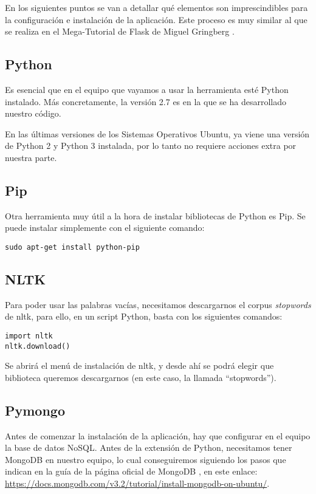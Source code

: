 En los siguientes puntos se van a detallar qué elementos son imprescindibles para la configuración e instalación de la aplicación. Este proceso es muy similar al que se realiza en el Mega-Tutorial de Flask de Miguel Gringberg \cite{flaskmegatutorial}.

\subsection{Python}
Es esencial que en el equipo que vayamos a usar la herramienta esté Python instalado. Más concretamente, la versión 2.7 es en la que se ha desarrollado nuestro código.

En las últimas versiones de los Sistemas Operativos Ubuntu, ya viene una versión de Python 2 y Python 3 instalada, por lo tanto no requiere acciones extra por nuestra parte.

\subsection{Pip}

Otra herramienta muy útil a la hora de instalar bibliotecas de Python es Pip. Se puede instalar simplemente con el siguiente comando: 

\begin{verbatim}
sudo apt-get install python-pip
\end{verbatim}

\subsection{NLTK}

Para poder usar las palabras vacías, necesitamos descargarnos el corpus \emph{stopwords} de nltk, para ello, en un script Python, basta con los siguientes comandos:

\begin{verbatim}
import nltk
nltk.download()
\end{verbatim}

Se abrirá el menú de instalación de nltk, y desde ahí se podrá elegir que biblioteca queremos descargarnos (en este caso, la llamada ``stopwords'').

\subsection{Pymongo}

Antes de comenzar la instalación de la aplicación, hay que configurar en el equipo la base de datos NoSQL. Antes de la extensión de Python, necesitamos tener MongoDB en nuestro equipo, lo cual conseguiremos siguiendo los pasos que indican en la guía de la página oficial de MongoDB \cite{Chodorow:2010:MDG:1941134}, en este enlace: \url{https://docs.mongodb.com/v3.2/tutorial/install-mongodb-on-ubuntu/}.

